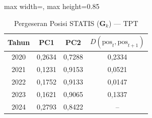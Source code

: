 \begin{table}[H]
\centering
\caption{Pergeseran Posisi STATIS ($\mathbf{G}_k$) --- TPT} \label{tab:app1jarak_statis_loading_tpt}
\begin{adjustbox}{max width=\textwidth, max height=0.85\textheight}
\begin{tabular}{|c|c|c|c|}
\hline
\textbf{Tahun} & \textbf{PC1} & \textbf{PC2} & \textbf{$D(\text{pos}_t, \text{pos}_{t+1})$} \\
\hline
2020 & 0,2634 & 0,7288 & 0,2334 \\
2021 & 0,1231 & 0,9153 & 0,0521 \\
2022 & 0,1752 & 0,9133 & 0,0147 \\
2023 & 0,1621 & 0,9065 & 0,1337 \\
2024 & 0,2793 & 0,8422 & -- \\
\hline
\end{tabular}
\end{adjustbox}
\end{table}